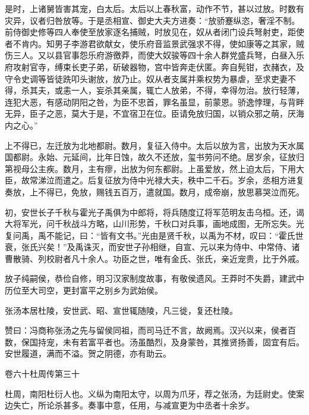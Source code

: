 \documentclass[12pt,UTF8]{ctexbook}
\begin{document}
是时，上诸舅皆害其宠，白太后。太后以上春秋富，动作不节，甚以过放。时数有灾异，议者归咎放等。于是丞相宣、御史大夫方进奏：“放骄蹇纵恣，奢淫不制。前侍御史修等四人奉使至放家逐名捕贼，时放见在，奴从者闭门设兵弩射吏，距使者不肯内。知男子李游君欲献女，使乐府音监景武强求不得，使如康等之其家，贼伤三人。又以县官事怨乐府游徼莽，而使大奴骏等四十余人群党盛兵弩，白昼入乐府攻射官寺，缚束长吏子弟，斫破器物，宫中皆奔走伏匿。奔自髡钳，衣赭衣，及守令史调等皆徒跣叩头谢放，放乃止。奴从者支属并乘权势为暴虐，至求吏妻不得，杀其夫，或恚一人，妄杀其亲属，辄亡人放弟，不得，幸得勿治。放行轻薄，连犯大恶，有感动阴阳之咎，为臣不忠首，罪名虽显，前蒙恩。骄逸悖理，与背畔无异，臣子之恶，莫大于是，不宜宿卫在位。臣请免放归国，以销众邪之萌，厌海内之心。”



上不得已，左迁放为北地都尉。数月，复征入侍中。太后以放为言，出放为天水属国都尉。永始、元延间，比年日蚀，故久不还放，玺书劳问不绝。居岁余，征放归第视母公主疾。数月，主有瘳，出放为何东都尉。上虽爱放，然上迫太后，下用大臣，故常涕泣而遣之。后复征放为侍中光禄大夫，秩中二千石。岁余，丞相方进复奏放，上不得已，免放，赐钱五百万，遣就国。数月，成帝崩，放思慕哭泣而死。



初，安世长子千秋与霍光子禹俱为中郎将，将兵随度辽将军范明友击乌桓。还，谒大将军光，问千秋战斗方略，山川形势，千秋口对兵事，画地成图，无所忘失。光复问禹，禹不能记，曰：“皆有文书。”光由是贤千秋，以禹为不材，叹曰：“霍氏世衰，张氏兴矣！”及禹诛灭，而安世子孙相继，自宣、元以来为侍中、中常侍、诸曹散骑、列校尉者凡十余人。功臣之世，唯有金氏、张氏，亲近宠贵，比于外戚。



放子纯嗣侯，恭俭自修，明习汉家制度故事，有敬侯遗风。王莽时不失爵，建武中历位至大司空，更封富平之别乡为武始侯。



张汤本居杜陵，安世武、昭、宣世辄随陵，凡三徙，复还杜陵。



赞曰：冯商称张汤之先与留侯同祖，而司马迁不言，故阙焉。汉兴以来，侯者百数，保国持宠，未有若富平者也。汤虽酷烈，及身蒙咎，其推贤扬善，固宜有后。安世履道，满而不溢。贺之阴德，亦有助云。





卷六十杜周传第三十



杜周，南阳杜衍人也。义纵为南阳太守，以周为爪牙，荐之张汤，为廷尉史。使案边失亡，所论杀甚多。奏事中意，任用，与减宣更为中丞者十余岁。
\end{document}
